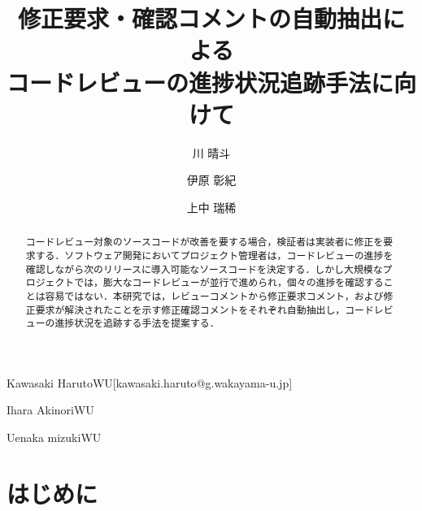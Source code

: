 \documentclass[submit,techrep,noauthor]{ipsj}
\begin{document}
\title{修正要求・確認コメントの自動抽出による\\
コードレビューの進捗状況追跡手法に向けて}



\author{川 晴斗}{Kawasaki Haruto}{WU}[kawasaki.haruto@g.wakayama-u.jp]
\author{伊原 彰紀}{Ihara Akinori}{WU}
\author{上中 瑞稀}{Uenaka mizuki}{WU}

\begin{abstract}
コードレビュー対象のソースコードが改善を要する場合，検証者は実装者に修正を要求する．ソフトウェア開発においてプロジェクト管理者は，コードレビューの進捗を確認しながら次のリリースに導入可能なソースコードを決定する．しかし大規模なプロジェクトでは，膨大なコードレビューが並行で進められ，個々の進捗を確認することは容易ではない．本研究では，レビューコメントから修正要求コメント，および修正要求が解決されたことを示す修正確認コメントをそれぞれ自動抽出し，コードレビューの進捗状況を追跡する手法を提案する．
\end{abstract}


%
%
%

\maketitle

\section{はじめに}
\end{document}

